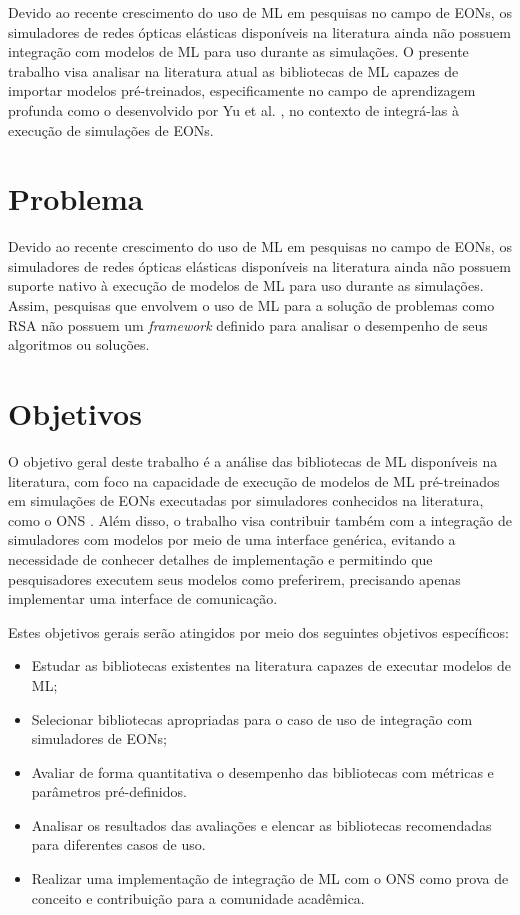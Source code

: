 Devido ao recente crescimento do uso de ML em pesquisas no campo de EONs, os simuladores de redes ópticas elásticas disponíveis na literatura ainda não possuem integração com modelos de ML para uso durante as simulações. O presente trabalho visa analisar na literatura atual as bibliotecas de ML capazes de importar modelos pré-treinados, especificamente no campo de aprendizagem profunda como o desenvolvido por Yu et al. \cite{eon_ml_rsa_dl_2019}, no contexto de integrá-las à execução de simulações de EONs.

\section{Problema}
\label{intro-problem}

Devido ao recente crescimento do uso de ML em pesquisas no campo de EONs, os simuladores de redes ópticas elásticas disponíveis na literatura ainda não possuem suporte nativo à execução de modelos de ML para uso durante as simulações. Assim, pesquisas que envolvem o uso de ML para a solução de problemas como RSA não possuem um \textit{framework} definido para analisar o desempenho de seus algoritmos ou soluções.

\section{Objetivos}
\label{intro-goals}

O objetivo geral deste trabalho é a análise das bibliotecas de ML disponíveis na literatura, com foco na capacidade de execução de modelos de ML pré-treinados em simulações de EONs executadas por simuladores conhecidos na literatura, como o ONS \cite{costa2016ons}. Além disso, o trabalho visa contribuir também com a integração de simuladores com modelos por meio de uma interface genérica, evitando a necessidade de conhecer detalhes de implementação e permitindo que pesquisadores executem seus modelos como preferirem, precisando apenas implementar uma interface de comunicação.

Estes objetivos gerais serão atingidos por meio dos seguintes objetivos específicos:

\begin{itemize}
  \item Estudar as bibliotecas existentes na literatura capazes de executar modelos de ML;
  \item Selecionar bibliotecas apropriadas para o caso de uso de integração com simuladores de EONs;
  \item Avaliar de forma quantitativa o desempenho das bibliotecas com métricas e parâmetros pré-definidos.
  \item Analisar os resultados das avaliações e elencar as bibliotecas recomendadas para diferentes casos de uso.
  \item Realizar uma implementação de integração de ML com o ONS como prova de conceito e contribuição para a comunidade acadêmica.
\end{itemize}

